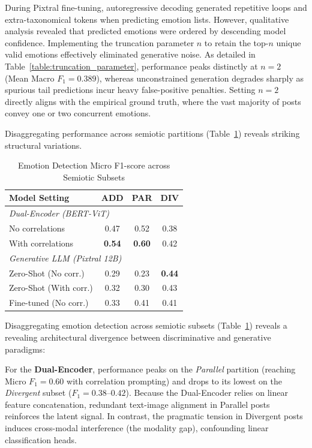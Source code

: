 During Pixtral fine-tuning, autoregressive decoding generated repetitive loops and extra-taxonomical tokens when predicting emotion lists. However, qualitative analysis revealed that predicted emotions were ordered by descending model confidence. Implementing the truncation parameter $n$ to retain the top-$n$ unique valid emotions effectively eliminated generative noise. As detailed in Table~\ref{table:truncation_parameter}, performance peaks distinctly at $n=2$ (Mean Macro $F_1 = 0.389$), whereas unconstrained generation degrades sharply as spurious tail predictions incur heavy false-positive penalties. Setting $n=2$ directly aligns with the empirical ground truth, where the vast majority of posts convey one or two concurrent emotions.

Disaggregating performance across semiotic partitions (Table~\ref{tab:subset_emotion}) reveals striking structural variations. 

\begin{table}[!t]
\centering
\caption{Emotion Detection Micro F1-score across Semiotic Subsets}
\label{tab:subset_emotion}
\small
\begin{tabular}{l c c c}
\hline
\textbf{Model Setting} & \textbf{ADD} & \textbf{PAR} & \textbf{DIV} \\
\hline
\multicolumn{4}{l}{\textit{Dual-Encoder (BERT-ViT)}} \\
No correlations & 0.47 & 0.52 & 0.38 \\
With correlations & \textbf{0.54} & \textbf{0.60} & 0.42 \\
\hline
\multicolumn{4}{l}{\textit{Generative LLM (Pixtral 12B)}} \\
Zero-Shot (No corr.) & 0.29 & 0.23 & \textbf{0.44} \\
Zero-Shot (With corr.) & 0.32 & 0.30 & 0.43 \\
Fine-tuned (No corr.) & 0.33 & 0.41 & 0.41 \\
\hline
\end{tabular}
\end{table}

Disaggregating emotion detection across semiotic subsets (Table~\ref{tab:subset_emotion}) reveals a revealing architectural divergence between discriminative and generative paradigms:

For the \textbf{Dual-Encoder}, performance peaks on the \textit{Parallel} partition (reaching Micro $F_1 = 0.60$ with correlation prompting) and drops to its lowest on the \textit{Divergent} subset ($F_1 = 0.38$--$0.42$). Because the Dual-Encoder relies on linear feature concatenation, redundant text-image alignment in Parallel posts reinforces the latent signal. In contrast, the pragmatic tension in Divergent posts induces cross-modal interference (the modality gap), confounding linear classification heads.

